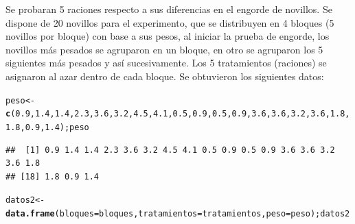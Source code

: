 \documentclass[12pt,letterpaper]{article}\usepackage[]{graphicx}\usepackage[]{color}
\makeatletter
\newcommand{\hlnum}[1]{\textcolor[rgb]{0.686,0.059,0.569}{#1}}%
\newcommand{\hlstd}[1]{\textcolor[rgb]{0.345,0.345,0.345}{#1}}%
\newcommand{\hlkwb}[1]{\textcolor[rgb]{0.69,0.353,0.396}{#1}}%
\newcommand{\hlkwc}[1]{\textcolor[rgb]{0.333,0.667,0.333}{#1}}%
\newcommand{\hlkwd}[1]{\textcolor[rgb]{0.737,0.353,0.396}{\textbf{#1}}}%
\newenvironment{kframe}{%
 \def\at@end@of@kframe{}%
 \ifinner\ifhmode%
  \def\at@end@of@kframe{\end{minipage}}%
  \begin{minipage}{\columnwidth}%
 \fi\fi%
 \def\FrameCommand##1{\hskip\@totalleftmargin \hskip-\fboxsep
 \colorbox{shadecolor}{##1}\hskip-\fboxsep
     \hskip-\linewidth \hskip-\@totalleftmargin \hskip\columnwidth}%
 \MakeFramed {\advance\hsize-\width
   \@totalleftmargin\z@ \linewidth\hsize
   \@setminipage}}%
 {\par\unskip\endMakeFramed%
 \at@end@of@kframe}
\newenvironment{knitrout}{}{} %
\makeatother
\begin{document}
Se probaran 5 raciones respecto a sus diferencias en el engorde de novillos. Se dispone de 20 novillos para el experimento, que se distribuyen en 4 bloques (5 novillos por bloque) con base a sus pesos, al iniciar la prueba de engorde, los novillos más pesados se agruparon en un bloque, en otro se agruparon los 5 siguientes m\'as pesados y as\'i sucesivamente. Los 5 tratamientos (raciones) se asignaron al azar dentro de cada bloque. Se obtuvieron los siguientes datos:

\begin{knitrout}
\color{fgcolor}\begin{kframe}
\begin{alltt}
\hlstd{peso} \hlkwb{<-} \hlkwd{c}\hlstd{(}\hlnum{0.9}\hlstd{,} \hlnum{1.4}\hlstd{,} \hlnum{1.4}\hlstd{,} \hlnum{2.3}\hlstd{,} \hlnum{3.6}\hlstd{,} \hlnum{3.2}\hlstd{,} \hlnum{4.5}\hlstd{,} \hlnum{4.1}\hlstd{,} \hlnum{0.5}\hlstd{,} \hlnum{0.9}\hlstd{,} \hlnum{0.5}\hlstd{,} \hlnum{0.9}\hlstd{,} \hlnum{3.6}\hlstd{,} \hlnum{3.6}\hlstd{,} \hlnum{3.2}\hlstd{,} \hlnum{3.6}\hlstd{,} \hlnum{1.8}\hlstd{,} \hlnum{1.8}\hlstd{,} \hlnum{0.9}\hlstd{,} \hlnum{1.4} \hlstd{);peso}
\end{alltt}
\begin{verbatim}
##  [1] 0.9 1.4 1.4 2.3 3.6 3.2 4.5 4.1 0.5 0.9 0.5 0.9 3.6 3.6 3.2 3.6 1.8
## [18] 1.8 0.9 1.4
\end{verbatim}
\begin{alltt}
\hlstd{datos2} \hlkwb{<-} \hlkwd{data.frame}\hlstd{(}\hlkwc{bloques} \hlstd{= bloques,} \hlkwc{tratamientos} \hlstd{= tratamientos,} \hlkwc{peso} \hlstd{= peso);datos2}
\end{alltt}


{\ttfamily\noindent\bfseries\color{errorcolor}{\#\# Error in data.frame(bloques = bloques, tratamientos = tratamientos, peso = peso): objeto 'bloques' no encontrado}}

{\ttfamily\noindent\bfseries\color{errorcolor}{\#\# Error in eval(expr, envir, enclos): objeto 'datos2' no encontrado}}\end{kframe}
\end{knitrout}
\end{document}
